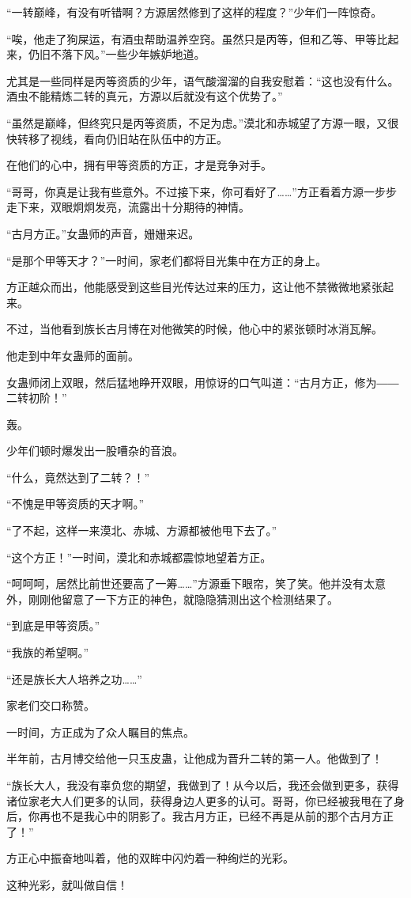 \begin{this_body}
“一转巅峰，有没有听错啊？方源居然修到了这样的程度？”少年们一阵惊奇。

“唉，他走了狗屎运，有酒虫帮助温养空窍。虽然只是丙等，但和乙等、甲等比起来，仍旧不落下风。”一些少年嫉妒地道。

尤其是一些同样是丙等资质的少年，语气酸溜溜的自我安慰着：“这也没有什么。酒虫不能精炼二转的真元，方源以后就没有这个优势了。”

“虽然是巅峰，但终究只是丙等资质，不足为虑。”漠北和赤城望了方源一眼，又很快转移了视线，看向仍旧站在队伍中的方正。

在他们的心中，拥有甲等资质的方正，才是竞争对手。

“哥哥，你真是让我有些意外。不过接下来，你可看好了……”方正看着方源一步步走下来，双眼炯炯发亮，流露出十分期待的神情。

“古月方正。”女蛊师的声音，姗姗来迟。

“是那个甲等天才？”一时间，家老们都将目光集中在方正的身上。

方正越众而出，他能感受到这些目光传达过来的压力，这让他不禁微微地紧张起来。

不过，当他看到族长古月博在对他微笑的时候，他心中的紧张顿时冰消瓦解。

他走到中年女蛊师的面前。

女蛊师闭上双眼，然后猛地睁开双眼，用惊讶的口气叫道：“古月方正，修为――二转初阶！”

轰。

少年们顿时爆发出一股嘈杂的音浪。

“什么，竟然达到了二转？！”

“不愧是甲等资质的天才啊。”

“了不起，这样一来漠北、赤城、方源都被他甩下去了。”

“这个方正！”一时间，漠北和赤城都震惊地望着方正。

“呵呵呵，居然比前世还要高了一筹……”方源垂下眼帘，笑了笑。他并没有太意外，刚刚他留意了一下方正的神色，就隐隐猜测出这个检测结果了。

“到底是甲等资质。”

“我族的希望啊。”

“还是族长大人培养之功……”

家老们交口称赞。

一时间，方正成为了众人瞩目的焦点。

半年前，古月博交给他一只玉皮蛊，让他成为晋升二转的第一人。他做到了！

“族长大人，我没有辜负您的期望，我做到了！从今以后，我还会做到更多，获得诸位家老大人们更多的认同，获得身边人更多的认可。哥哥，你已经被我甩在了身后，你再也不是我心中的阴影了。我古月方正，已经不再是从前的那个古月方正了！”

方正心中振奋地叫着，他的双眸中闪灼着一种绚烂的光彩。

这种光彩，就叫做自信！

\end{this_body}

